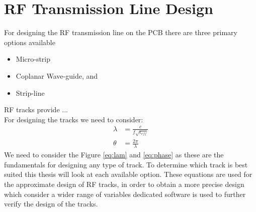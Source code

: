 \documentclass[12pt,openany,a4paper]{book}
\begin{document}
\section{RF Transmission Line Design}
For designing the RF transmission line on the PCB there are three primary options available
\begin{itemize}[noitemsep,topsep=0.5pt]
	\item Micro-strip
	\item Coplanar Wave-guide, and
	\item Strip-line
\end{itemize}
RF tracks provide ...\\
For designing the tracks we need to consider:
\begin{align}
\lambda&= \frac{c}{f\sqrt{\epsilon_{eff}}} \label{eq:lam} \\
\theta &= \frac{2 \pi}{\lambda} \label{eq:phase}
\end{align}
We need to consider the Figure \ref{eq:lam} and \ref{eq:phase} as these are the fundamentals for designing any type of track. To determine which track is best suited this thesis will look at each available option.\newline
These equations are used for the approximate design of RF tracks, in order to obtain a more precise design which consider a wider range of variables dedicated software is  used to further verify the design of the tracks.
\end{document}
